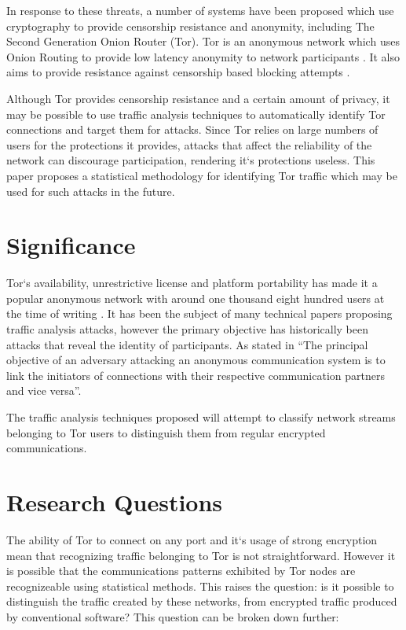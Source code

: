\documentclass{conference}
\begin{document}
In response to these threats, a number of systems have been proposed which use cryptography to provide censorship resistance and anonymity, including The Second Generation Onion Router (Tor). Tor is an anonymous network which uses Onion Routing to provide low latency anonymity to network participants \citep{Dingledine:2004p314}. It also aims to provide resistance against censorship based blocking attempts \citep{Dingledine:2008p1542}.

Although Tor provides censorship resistance and a certain amount of privacy, it may be possible to use traffic analysis techniques to automatically identify Tor connections and target them for attacks. Since Tor relies on large numbers of users for the protections it provides, attacks that affect the reliability of the network can discourage participation, rendering it`s protections useless. This paper proposes a statistical methodology for identifying Tor traffic which may be used for such attacks in the future.

\section{Significance}

Tor`s availability, unrestrictive license and platform portability has made it a popular anonymous network with around one thousand eight hundred users at the time of writing \citep{website:tor-anonymity-online}. It has been the subject of many technical papers proposing traffic analysis attacks, however the primary objective has historically been attacks that reveal the identity of participants. As stated in \citet{Murdoch:2005p325} ``The principal objective of an adversary attacking an anonymous communication system is to link the initiators of connections with their respective communication partners and vice versa''.

The traffic analysis techniques proposed will attempt to classify network streams belonging to Tor users to distinguish them from regular encrypted communications.

\section{Research Questions}

The ability of Tor to connect on any port and it`s usage of strong encryption mean that recognizing traffic belonging to Tor is not straightforward. However it is possible that the communications patterns exhibited by Tor nodes are recognizeable using statistical methods. This raises the question: is it possible to distinguish the traffic created by these networks, from encrypted traffic produced by conventional software? This question can be broken down further:
\end{document}

